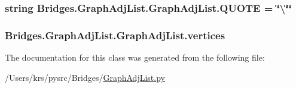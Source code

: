 \subsubsection[{Q\+U\+O\+T\+E}]{\setlength{\rightskip}{0pt plus 5cm}string Bridges.\+Graph\+Adj\+List.\+Graph\+Adj\+List.\+Q\+U\+O\+T\+E = \char`\"{}\textbackslash{}\char`\"{}\char`\"{}\hspace{0.3cm}{\ttfamily [static]}}\label{class_bridges_1_1_graph_adj_list_1_1_graph_adj_list_aafbead52fee7d8747fd6396729818174}
\hypertarget{class_bridges_1_1_graph_adj_list_1_1_graph_adj_list_aa881a72ec9ca14ee0a3fa712143109e0}{}
\subsubsection[{vertices}]{\setlength{\rightskip}{0pt plus 5cm}Bridges.\+Graph\+Adj\+List.\+Graph\+Adj\+List.\+vertices}\label{class_bridges_1_1_graph_adj_list_1_1_graph_adj_list_aa881a72ec9ca14ee0a3fa712143109e0}


The documentation for this class was generated from the following file\+:\begin{DoxyCompactItemize}
\item 
/\+Users/krs/pysrc/\+Bridges/\hyperlink{_graph_adj_list_8py}{Graph\+Adj\+List.\+py}\end{DoxyCompactItemize}
